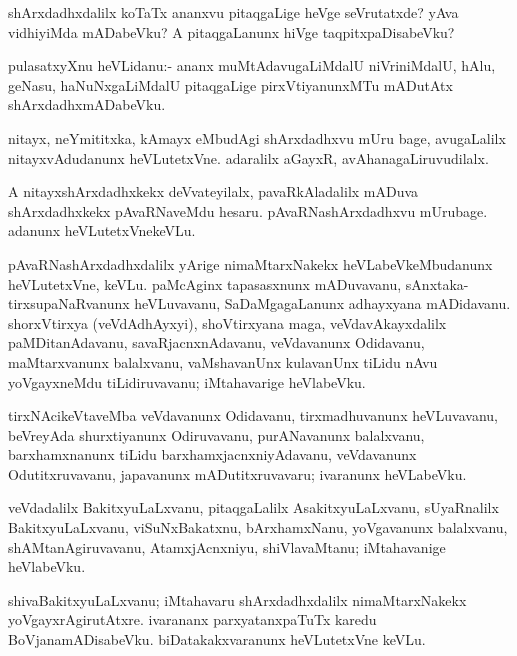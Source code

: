 \documentclass{article}
\begin{document}
\begin{mn}
shArxdadhxdalilx koTaTx ananxvu pitaqgaLige heVge seVrutatxde? yAva
vidhiyiMda mADabeVku? A pitaqgaLanunx hiVge taqpitxpaDisabeVku?
\end{mn}

\begin{mn}
pulasatxyXnu heVLidanu:- ananx muMtAdavugaLiMdalU niVriniMdalU, hAlu,
geNasu, haNuNxgaLiMdalU pitaqgaLige pirxVtiyanunxMTu mADutAtx shArxdadhxmADabeVku.
\end{mn}

\begin{mn}
nitayx, neYmititxka, kAmayx eMbudAgi shArxdadhxvu mUru bage,
avugaLalilx nitayxvAdudanunx heVLutetxVne. adaralilx aGayxR,
avAhanagaLiruvudilalx. 
\end{mn}

\begin{mn}%
A nitayxshArxdadhxkekx deVvateyilalx, pavaRkAladalilx mADuva
shArxdadhxkekx pAvaRNaveMdu hesaru. pAvaRNashArxdadhxvu
mUrubage. adanunx heVLutetxVnekeVLu.
\end{mn}

\begin{mn}%
pAvaRNashArxdadhxdalilx yArige nimaMtarxNakekx heVLabeVkeMbudanunx
heVLutetxVne, keVLu. paMcAginx tapasasxnunx mADuvavanu,
sAnxtaka-tirxsupaNaRvanunx heVLuvavanu, SaDaMgagaLanunx adhayxyana
mADidavanu. shorxVtirxya (veVdAdhAyxyi), shoVtirxyana maga,
veVdavAkayxdalilx paMDitanAdavanu, savaRjacnxnAdavanu, veVdavanunx
Odidavanu, maMtarxvanunx balalxvanu, vaMshavanUnx kulavanUnx tiLidu
nAvu yoVgayxneMdu tiLidiruvavanu; iMtahavarige heVlabeVku.
\end{mn}

\begin{mn}%
tirxNAcikeVtaveMba veVdavanunx Odidavanu, tirxmadhuvanunx heVLuvavanu,
beVreyAda shurxtiyanunx Odiruvavanu, purANavanunx balalxvanu,
barxhamxnanunx tiLidu barxhamxjacnxniyAdavanu, veVdavanunx
Odutitxruvavanu, japavanunx mADutitxruvavaru; ivaranunx heVLabeVku.
\end{mn}

\begin{mn}
veVdadalilx BakitxyuLaLxvanu, pitaqgaLalilx AsakitxyuLaLxvanu,
sUyaRnalilx BakitxyuLaLxvanu, viSuNxBakatxnu, bArxhamxNanu,
yoVgavanunx balalxvanu, shAMtanAgiruvavanu, AtamxjAcnxniyu,
shiVlavaMtanu; iMtahavanige heVlabeVku.
\end{mn}

\begin{mn}
shivaBakitxyuLaLxvanu; iMtahavaru shArxdadhxdalilx nimaMtarxNakekx
yoVgayxrAgirutAtxre. ivarananx parxyatanxpaTuTx karedu
BoVjanamADisabeVku. biDatakakxvaranunx heVLutetxVne keVLu.
\end{mn}
\end{document}
